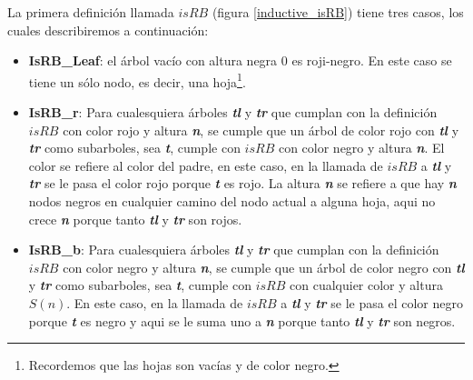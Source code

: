 La primera definici\'on llamada \hyperref[inductive_isRB]{$isRB$} (figura \ref{inductive_isRB}) 
tiene tres casos, los cuales describiremos a continuaci\'on:
\begin{itemize}
        \item \textbf{IsRB\_Leaf}: el árbol vacío con altura negra 0 es roji-negro. En este caso
        se tiene un s\'olo nodo, es decir, una hoja\footnote{Recordemos que las hojas son vac\'ias y de
        color negro.}.
        \item \textbf{IsRB\_r}: Para cualesquiera \'arboles \textbf{\textit{tl}} y 
        \textbf{\textit{tr}} que cumplan con la definici\'on \hyperref[inductive_isRB]{$isRB$} con 
        color rojo y altura \textbf{\textit{n}}, se cumple que un \'arbol de color rojo con 
        \textbf{\textit{tl}} y \textbf{\textit{tr}} como subarboles, sea \textbf{\textit{t}}, cumple 
        con \hyperref[inductive_isRB]{$isRB$} con color negro y altura \textbf{\textit{n}}. El color 
        se refiere al color del padre, en este caso, en la llamada de 
        \hyperref[inductive_isRB]{$isRB$} a \textbf{\textit{tl}} y \textbf{\textit{tr}} se le pasa 
        el color rojo porque \textbf{\textit{t}} es rojo. La altura \textbf{\textit{n}} se refiere a 
        que hay \textbf{\textit{n}} nodos negros en cualquier camino del nodo actual a alguna hoja, 
        aqui no crece \textbf{\textit{n}} porque tanto
        \textbf{\textit{tl}} y \textbf{\textit{tr}} son rojos.
        \item \textbf{IsRB\_b}: Para cualesquiera \'arboles \textbf{\textit{tl}} y 
        \textbf{\textit{tr}} que cumplan con la definici\'on \hyperref[inductive_isRB]{$isRB$} con 
        color negro y altura \textbf{\textit{n}}, se cumple que un \'arbol de color negro con 
        \textbf{\textit{tl}} y \textbf{\textit{tr}} como subarboles, sea \textbf{\textit{t}}, cumple 
        con \hyperref[inductive_isRB]{$isRB$} con cualquier color y altura $S(n)$. En este caso, en 
        la llamada de \hyperref[inductive_isRB]{$isRB$} a \textbf{\textit{tl}} y 
        \textbf{\textit{tr}} se le pasa el color negro porque \textbf{\textit{t}} es negro y aqui se 
        le suma uno a \textbf{\textit{n}} porque tanto \textbf{\textit{tl}} y \textbf{\textit{tr}} 
        son negros.
\end{itemize}

